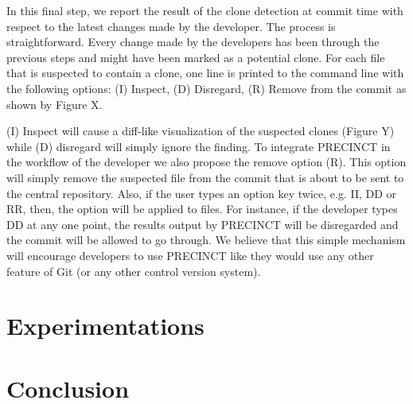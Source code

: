 \documentclass[conference]{IEEEtran}
\begin{document}
In this final step, we report the result of the clone detection at commit time with respect to the latest changes made by the developer. The process is straightforward. Every change made by the developers has been through the previous steps and might have been marked as a potential clone. For each file that is suspected to contain a clone, one line is printed to the command line with the following options: (I) Inspect, (D) Disregard, (R) Remove from the commit as shown by Figure X.

(I) Inspect will cause a diff-like visualization of the suspected clones (Figure Y) while (D) disregard will simply ignore the finding.
To integrate PRECINCT in the workflow of the developer we also propose the  remove option (R). This option will simply remove the suspected file from the commit that is about to be sent to the central repository. Also, if the user types an option key twice, e.g. II, DD or RR, then, the option will be applied to files. For instance, if the developer types DD at any one point, the results output by PRECINCT will be disregarded and the commit will be allowed to go through. We believe that this simple mechanism will encourage developers to use PRECINCT like they would use any other feature of Git (or any other control version system).







\section{Experimentations}
\label{sec:Experimentations}

\section{Conclusion}
\label{sec:Conclusion}









\end{document}
